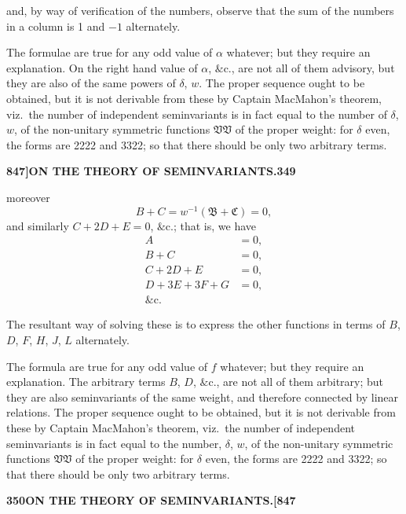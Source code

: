 \documentclass[11pt,a4paper]{book}
\begin{document}
and, by way of verification of the numbers, observe that the sum of the numbers in a column is 1 and $-1$ alternately.

The formulae are true for any odd value of $\alpha$ whatever; but they require an explanation. On the right hand value of $\alpha$, $\&\text{c.}$, are not all of them advisory, but they are also of the same powers of $\delta$, $w$. The proper sequence ought to be obtained, but it is not derivable from these by Captain MacMahon's theorem, viz.\ the number of independent seminvariants is in fact equal to the number of $\delta$, $w$, of the non-unitary symmetric functions $\mathfrak{V}\mathfrak{V}$ of the proper weight: for $\delta$ even, the forms are 2222 and 3322; so that there should be only two arbitrary terms.

\newpage
\setcounter{page}{349}

\noindent\textbf{847]}\hfill\textbf{ON THE THEORY OF SEMINVARIANTS.}\hfill\textbf{349}

\bigskip

\noindent moreover
\[
B + C = w^{-1}(\mathfrak{B} + \mathfrak{C}) = 0,
\]
and similarly $C + 2D + E = 0$, $\&\text{c.}$; that is, we have
\begin{align*}
A &= 0, \\
B + C &= 0, \\
C + 2D + E &= 0, \\
D + 3E + 3F + G &= 0, \\
\&\text{c.}
\end{align*}

The resultant way of solving these is to express the other functions in terms of $B$, $D$, $F$, $H$, $J$, $L$ alternately.

The formula are true for any odd value of $f$ whatever; but they require an explanation. The arbitrary terms $B$, $D$, $\&\text{c.}$, are not all of them arbitrary; but they are also seminvariants of the same weight, and therefore connected by linear relations. The proper sequence ought to be obtained, but it is not derivable from these by Captain MacMahon's theorem, viz.\ the number of independent seminvariants is in fact equal to the number, $\delta$, $w$, of the non-unitary symmetric functions $\mathfrak{V}\mathfrak{V}$ of the proper weight: for $\delta$ even, the forms are 2222 and 3322; so that there should be only two arbitrary terms.

\newpage
\setcounter{page}{350}

\noindent\textbf{350}\hfill\textbf{ON THE THEORY OF SEMINVARIANTS.}\hfill\textbf{[847}
\end{document}

